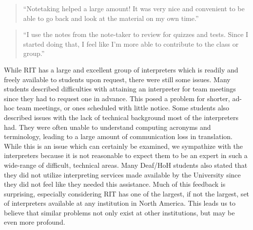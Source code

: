 \documentclass[conference]{IEEEtran}
\begin{document}
\begin{quotation}
``Notetaking helped a large amount! It was very nice and convenient to be able to go back and look at the material on my own time.''
\end{quotation}

\begin{quotation}
``I use the notes from the note-taker to review for quizzes and tests. Since I started doing that, I feel like I'm more able to contribute to the class or group.''
\end{quotation}



While RIT has a large and excellent group of interpreters which is readily and freely available to students upon request, there were still some issues. Many students described difficulties with attaining an interpreter for team meetings since they had to request one in advance. This posed a problem for shorter, ad-hoc team meetings, or ones scheduled with little notice. Some students also described issues with the lack of technical background most of the interpreters had. They were often unable to understand computing acronyms and terminology, leading to a large amount of communication loss in translation. While this is an issue which can certainly be examined, we sympathize with the interpreters because it is not reasonable to expect them to be an expert in such a wide-range of difficult, technical areas. Many Deaf/HoH students also stated that they did not utilize interpreting services made available by the University since they did not feel like they needed this assistance. Much of this feedback is surprising, especially considering RIT has one of the largest, if not the largest, set of interpreters available at any institution in North America. This leads us to believe that similar problems not only exist at other institutions, but may be even more profound.
\end{document}
